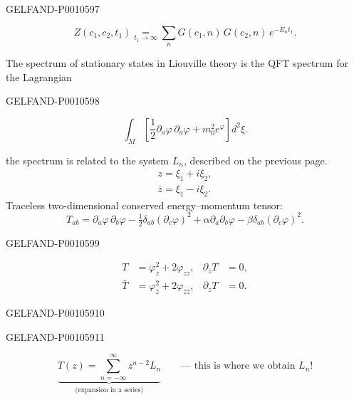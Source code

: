 \begin{GelfandAdjacentEvidence}{GELFAND-P001059}{7}

\begin{equation*}
Z(c_1,c_2,t_1)\underset{t_1\to\infty}{=}
  \sum_nG(c_1,n)\,G(c_2,n)\,e^{-E_nt_1}.
\tag{5}
\end{equation*}

The spectrum of stationary states in Liouville theory is the QFT spectrum for the Lagrangian
\end{GelfandAdjacentEvidence}
\begin{GelfandAdjacentEvidence}{GELFAND-P001059}{8}

\begin{equation*}
\int_M\left[\frac12\partial_a\varphi\,\partial_a\varphi+
  m_0^2e^\varphi\right]d^2\xi.
\tag{6}
\end{equation*}

 the spectrum is related to the system \(L_n\), described on the previous page.
\begin{gather*}
z=\xi_1+i\xi_2,\\
\bar z=\xi_1-i\xi_2.
\end{gather*}
Traceless two-dimensional conserved energy–momentum tensor:
\[
T_{ab}=\partial_a\varphi\,\partial_b\varphi
   -\tfrac12\delta_{ab}(\partial_c\varphi)^2
   +\alpha\partial_a\partial_b\varphi-\beta\delta_{ab}(\partial_c\varphi)^2.
\]
\end{GelfandAdjacentEvidence}
\begin{GelfandAdjacentEvidence}{GELFAND-P001059}{9}

\begin{align*}
T&=\varphi_z^2+2\varphi_{zz},&
\partial_{\bar z}T&=0,\\
\bar T&=\varphi_{\bar z}^2+2\varphi_{\bar z\bar z},&
\partial_zT&=0.
\end{align*}
\end{GelfandAdjacentEvidence}
\begin{GelfandAdjacentEvidence}{GELFAND-P001059}{10}

\end{GelfandAdjacentEvidence}
\begin{GelfandAdjacentEvidence}{GELFAND-P001059}{11}


\[
\underbrace{T(z)=\sum_{n=-\infty}^{\infty}z^{n-2}L_n}_{\text{(expansion in a series)}}
\qquad\text{— this is where we obtain }L_n!
\]
\end{GelfandAdjacentEvidence}



